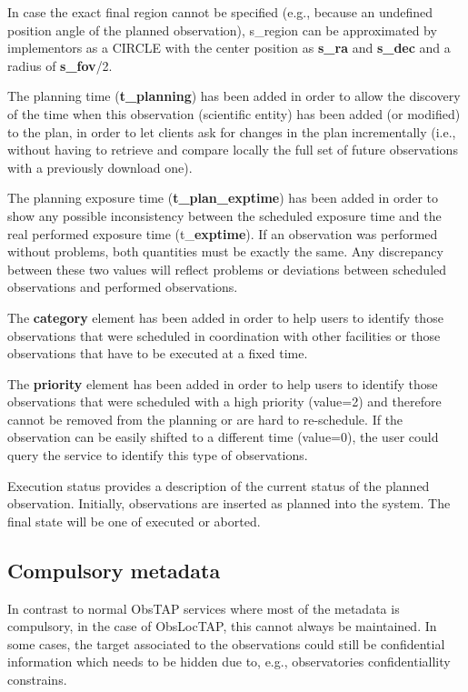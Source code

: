 \documentclass[11pt,a4paper]{ivoa}
\begin{document}
In case the exact final region cannot be specified (e.g., because an undefined position angle of the planned observation), s\_region can be approximated by
implementors as a CIRCLE with the center position as \textbf{s\_ra} and 
\textbf{s\_dec} and a radius of \textbf{s\_fov}/2.

The planning time (\textbf{t\_planning}) has been added in order to allow the discovery 
of the time when this observation (scientific entity) has been added (or modified) to 
the plan, in order to let clients ask for changes in the plan incrementally (i.e., 
without having to retrieve and compare locally the full set of future observations 
with a previously download one).

The planning exposure time (\textbf{t\_plan\_exptime}) has been added in order to 
show any possible inconsistency between the scheduled exposure time and the real 
performed exposure time (t\_\textbf{exptime}). If an observation was performed without 
problems, both quantities must be exactly the same. Any discrepancy between these two 
values will reflect problems or deviations between scheduled observations and performed 
observations.

The \textbf{category} element has been added in order to help users to identify those 
observations that were scheduled in coordination with other facilities or those 
observations that have to be executed at a fixed time.

The \textbf{priority} element has been added in order to help users to identify those 
observations that were scheduled with a high priority (value=2) and therefore cannot be 
removed from the planning or are hard to re-schedule. If the observation can be easily 
shifted to a different time (value=0), the user could query the service to identify this 
type of observations.

Execution status provides a description of the current status of the planned observation. 
Initially, observations are inserted as planned into the system. The final state will 
be one of executed or aborted.

\subsection{Compulsory metadata}
In contrast to normal ObsTAP services where most of the metadata is compulsory, in the 
case of ObsLocTAP, this cannot always be maintained. In some cases, the target associated to the observations could still be confidential information which needs to
be hidden due to, e.g., observatories confidentiallity constrains.
\end{document}
